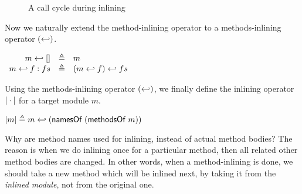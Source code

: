 \begin{figure}[t]
  \begin{subfigure}[b]{0.5\textwidth}
  \end{subfigure}
  \begin{subfigure}[b]{0.5\textwidth}
  \end{subfigure}
  \caption{A call cycle during inlining}
  \label{ex-inlining-callcycle}
\end{figure}

Now we naturally extend the method-inlining operator to a
methods-inlining operator $(\hookleftarrow)$.
\begin{definition}
  \label{def-inlinedms}
  \mbox{}
  \begin{center}
    \begin{math}
      \begin{array}{rcl}
        m \hookleftarrow{} [] & \triangleq & m \\
        m \hookleftarrow{} f : fs & \triangleq & (m \hookleftarrow{} f) \hookleftarrow{} fs \\
      \end{array}
    \end{math}
  \end{center}
\end{definition}
Using the methods-inlining operator $(\hookleftarrow)$, we finally define the
inlining operator $| \cdot |$ for a target module $m$.
\begin{definition}
  \label{def-inline}
  \mbox{}
  \begin{center}
    \begin{math}
      | m | \triangleq m \hookleftarrow{} (\textsf{namesOf}\ (\textsf{methodsOf}\ m))
    \end{math}
  \end{center}
\end{definition}

Why are method names used for inlining, instead of actual method
bodies? The reason is when we do inlining once for a particular
method, then all related other method bodies are changed. In other
words, when a method-inlining is done, we should take a new method
which will be inlined next, by taking it from the \emph{inlined
  module}, not from the original one.


